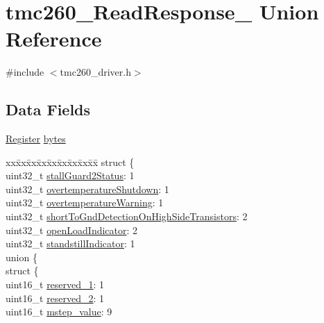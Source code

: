 \hypertarget{uniontmc260___read_response__}{}\section{tmc260\+\_\+\+Read\+Response\+\_\+ Union Reference}
\label{uniontmc260___read_response__}


{\ttfamily \#include $<$tmc260\+\_\+driver.\+h$>$}

\subsection*{Data Fields}
\begin{DoxyCompactItemize}
\item 
\mbox{\hyperlink{tmc260__driver_8h_a280b01a3b5bb4294fcee278b00c030d6}{Register}} \mbox{\hyperlink{uniontmc260___read_response___a445b72174063a88455cd86c22d77d03f}{bytes}}
\item 
\begin{tabbing}
xx\=xx\=xx\=xx\=xx\=xx\=xx\=xx\=xx\=\kill
struct \{\\
\>uint32\_t \mbox{\hyperlink{uniontmc260___read_response___a5ac1bab472122a680468bfa1dc4254e2}{stallGuard2Status}}: 1\\
\>uint32\_t \mbox{\hyperlink{uniontmc260___read_response___ab00b29a3398325c043335ca02205d379}{overtemperatureShutdown}}: 1\\
\>uint32\_t \mbox{\hyperlink{uniontmc260___read_response___a94f0ef187da54dc5a88c2525771831dd}{overtemperatureWarning}}: 1\\
\>uint32\_t \mbox{\hyperlink{uniontmc260___read_response___a19b92494acbcf786333b633e465aa595}{shortToGndDetectionOnHighSideTransistors}}: 2\\
\>uint32\_t \mbox{\hyperlink{uniontmc260___read_response___a082cde0e244aa96ca7271b787e8ef4b9}{openLoadIndicator}}: 2\\
\>uint32\_t \mbox{\hyperlink{uniontmc260___read_response___a3ba6b5b6d17c535e9cdefe0ea2ff49fc}{standstillIndicator}}: 1\\
\>union \{\\
\>\>struct \{\\
\>\>\>uint16\_t \mbox{\hyperlink{uniontmc260___read_response___ac8de773adfdd04f1a20597335bca6942}{reserved\_1}}: 1\\
\>\>\>uint16\_t \mbox{\hyperlink{uniontmc260___read_response___a46818f8a5de2f6713b5f19d594e11ef3}{reserved\_2}}: 1\\
\>\>\>uint16\_t \mbox{\hyperlink{uniontmc260___read_response___a1c51ef0d94758b9450a583067c9d7eef}{mstep\_value}}: 9\\

\end{tabbing}
\end{DoxyCompactItemize}

